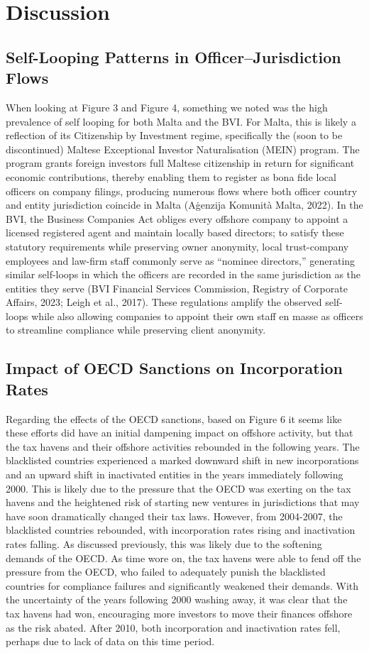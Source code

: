 \documentclass{article}
\begin{document}
\section{Discussion}
\subsection{Self-Looping Patterns in Officer–Jurisdiction Flows}
When looking at Figure 3 and Figure 4, something we noted was the high prevalence of self looping for both Malta and the BVI. For Malta, this is likely a reflection of its Citizenship by Investment regime, specifically the (soon to be discontinued) Maltese Exceptional Investor Naturalisation (MEIN) program. The program grants foreign investors full Maltese citizenship in return for significant economic contributions, thereby enabling them to register as bona fide local officers on company filings, producing numerous flows where both officer country and entity jurisdiction coincide in Malta (Aġenzija Komunità Malta, 2022). In the BVI, the Business Companies Act obliges every offshore company to appoint a licensed registered agent and maintain locally based directors; to satisfy these statutory requirements while preserving owner anonymity, local trust-company employees and law-firm staff commonly serve as “nominee directors,” generating similar self-loops in which the officers are recorded in the same jurisdiction as the entities they serve (BVI Financial Services Commission, Registry of Corporate Affairs, 2023; Leigh et al., 2017). These regulations amplify the observed self-loops while also allowing companies to appoint their own staff en masse as officers to streamline compliance while preserving client anonymity. 

\subsection{Impact of OECD Sanctions on Incorporation Rates}
Regarding the effects of the OECD sanctions, based on Figure 6 it seems like these efforts did have an initial dampening impact on offshore activity, but that the tax havens and their offshore activities rebounded in the following years. The blacklisted countries experienced a marked downward shift in new incorporations and an upward shift in inactivated entities in the years immediately following 2000. This is likely due to the pressure that the OECD was exerting on the tax havens and the heightened risk of starting new ventures in jurisdictions that may have soon dramatically changed their tax laws. However, from 2004-2007, the blacklisted countries rebounded, with incorporation rates rising and inactivation rates falling. As discussed previously, this was likely due to the softening demands of the OECD. As time wore on, the tax havens were able to fend off the pressure from the OECD, who failed to adequately punish the blacklisted countries for compliance failures and significantly weakened their demands. With the uncertainty of the years following 2000 washing away, it was clear that the tax havens had won, encouraging more investors to move their finances offshore as the risk abated. After 2010, both incorporation and inactivation rates fell, perhaps due to lack of data on this time period.
\end{document}

